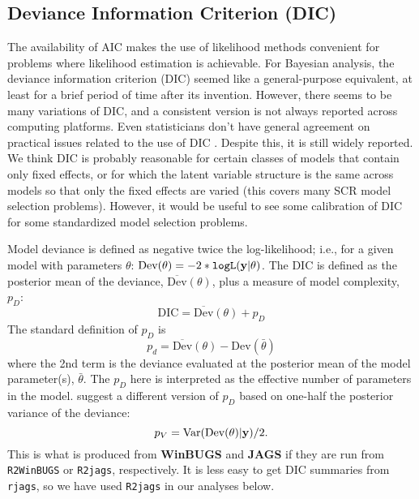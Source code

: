 \subsection{Deviance Information Criterion (DIC) }

The availability of AIC makes the use of likelihood methods convenient
for problems where likelihood estimation is achievable.  For Bayesian
analysis, the deviance information criterion (DIC) seemed like a
general-purpose equivalent, at least for a brief period of time after
its invention.  However, there seems to be many variations of DIC, and
a consistent version is not always reported across computing
platforms.
Even statisticians don't have general agreement on practical issues
related to the use of DIC \citep{millar:2009}.
Despite this, it is
still widely reported. We think DIC is probably reasonable for certain
classes of models that contain only fixed effects, or for which the
latent variable structure is the same across models so that only the
fixed effects are varied (this covers many SCR model selection
problems).  However, it would be useful to see some calibration of DIC
for some standardized model selection problems.

Model deviance is defined as negative twice the log-likelihood;
i.e., for a given model with parameters $\theta$: $\mbox{Dev}(\theta) =
-2*\mbox{\tt logL}({\bf y}|\theta)$.  The DIC is defined as the
posterior mean of the deviance, $\overline{\mbox{Dev}}(\theta)$, plus a measure of model complexity,
$p_{D}$:
\[
 \mbox{DIC} = \overline{\mbox{Dev}}(\theta) + p_{D}
\]
The standard definition of $p_{D}$ is
\[
 p_{d} = \overline{\mbox{Dev}}(\theta) - \mbox{Dev}(\bar{\theta})
\]
where the 2nd term is the deviance evaluated at the posterior mean of
the model parameter(s), $\bar{\theta}$. The $p_{D}$ here is interpreted as the effective
number of parameters in the model.  \citet{gelman_etal:2004} suggest a
different version of $p_{D}$ based on one-half the posterior variance
of the deviance:
\[
 p_{V} = \mbox{Var}(\mbox{Dev}(\theta)|{\bf y})/2.
\]
This is what is produced from {\bf WinBUGS} and {\bf JAGS} if they are
run from \mbox{\tt R2WinBUGS} or \mbox{\tt R2jags}, respectively.  It
is less easy to get DIC summaries from \mbox{\tt rjags}, so we have
used \mbox{\tt R2jags} in our analyses below.


